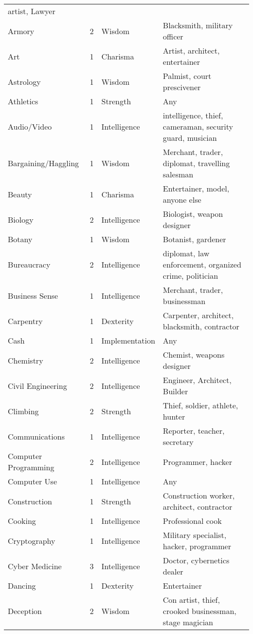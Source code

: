 \documentclass[twoside]{book}
\begin{document}
\begin{longtable}{p{1.25in}llp{12em}}
           artist, Lawyer \tabularnewline
      \raggedright Armory & 2 & Wisdom & Blacksmith, military
           officer \tabularnewline
      \raggedright Art & 1 & Charisma & Artist, architect,
           entertainer \tabularnewline
      \raggedright Astrology & 1 & Wisdom & Palmist, court
           prescivener \tabularnewline
      \raggedright Athletics & 1 & Strength & Any \tabularnewline
      \raggedright Audio/Video & 1 & Intelligence & intelligence, thief,
           cameraman, security guard, musician \tabularnewline
      \raggedright Bargaining/Haggling & 1 & Wisdom & Merchant, trader,
           diplomat, travelling salesman \tabularnewline
      \raggedright Beauty & 1 & Charisma & Entertainer, model,
           anyone else \tabularnewline
      \raggedright Biology & 2 & Intelligence & Biologist, weapon
           designer \tabularnewline
      \raggedright Botany & 1 & Wisdom & Botanist, gardener
           \tabularnewline
      \raggedright Bureaucracy & 2 & Intelligence & diplomat, law
           enforcement, organized crime, politician \tabularnewline
      \raggedright Business Sense & 1 & Intelligence & Merchant, trader,
           businessman \tabularnewline
      \raggedright Carpentry & 1 & Dexterity & Carpenter, architect,
           blacksmith, contractor \tabularnewline
      \raggedright Cash & 1 & Implementation & Any \tabularnewline
      \raggedright Chemistry & 2 & Intelligence & Chemist, weapons designer
           \tabularnewline
      \raggedright Civil Engineering & 2 & Intelligence & Engineer, Architect,
           Builder \tabularnewline
      \raggedright Climbing & 2 & Strength & Thief, soldier, athlete,
           hunter \tabularnewline
      \raggedright Communications & 1 & Intelligence & Reporter, teacher,
           secretary \tabularnewline
      \raggedright Computer Programming & 2 & Intelligence & Programmer, hacker
           \tabularnewline
      \raggedright Computer Use & 1 & Intelligence & Any \tabularnewline
      \raggedright Construction & 1 & Strength & Construction worker,
           architect, contractor \tabularnewline
      \raggedright Cooking & 1 & Intelligence & Professional cook
           \tabularnewline
      \raggedright Cryptography & 1 & Intelligence & Military specialist,
           hacker, programmer \tabularnewline
      \raggedright Cyber Medicine & 3 & Intelligence & Doctor, cybernetics
           dealer \tabularnewline
      \raggedright Dancing & 1 & Dexterity & Entertainer \tabularnewline
      \raggedright Deception & 2 & Wisdom & Con artist, thief,
           crooked businessman, stage magician \tabularnewline

\end{longtable}
\end{document}
